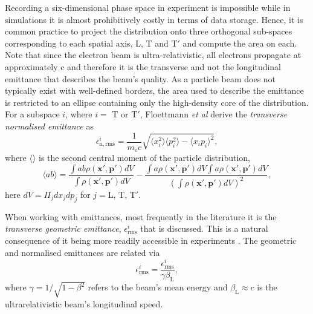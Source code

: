 Recording a six-dimensional phase space in experiment is impossible while in simulations it is almost prohibitively costly in terms of data storage. Hence, it is common practice to project the distribution onto three orthogonal sub-spaces corresponding to each spatial axis, L, T and T$'$ and compute the area on each. Note that since the electron beam is ultra-relativistic, all electrons propagate at approximately c and therefore it is the transverse and not the longitudinal emittance that describes the beam's quality. As a particle beam does not typically exist with well-defined borders, the area used to describe the emittance is restricted to an ellipse containing only the high-density core of the distribution. For a subspace $i$, where $i = $ T or T$'$, Floettmann \textit{et al} \cite{floettmannBasicFeaturesBeam2003} derive the \textit{transverse normalised emittance} as
\begin{equation}\label{eq:app_epsilon_n}
	\epsilon^i_\mathrm{n,rms} = \frac{1}{m_\mathrm{e}c} \sqrt{\langle x^2_i\rangle\langle p^2_i\rangle - \langle x_ip_i\rangle^2},
\end{equation}
where $\langle\rangle$ is the second central moment of the particle distribution,
\begin{equation}
	\langle ab \rangle = \frac{\int ab\rho(\mathbf{x}',\mathbf{p}')dV}{\int \rho (\mathbf{x}',\mathbf{p}')dV} - \frac{\int a\rho(\mathbf{x}',\mathbf{p}')dV\int a\rho(\mathbf{x}',\mathbf{p}')dV}{(\int \rho (\mathbf{x}',\mathbf{p}')dV)^2},
\end{equation}
here $dV = \Pi_jdx_jdp_j$ for $j = $L, T, T$'$.

When working with emittances, most frequently in the literature it is the \textit{transverse geometric emittance}, $\epsilon^i_\mathrm{rms}$ that is discussed. This is a natural consequence of it being more readily accessible in experiments \cite{mcDonald Methods of emittance measurement 122-132 Springer, 1989}. The geometric and normalised emittances are related via
\begin{equation}
	\epsilon^i_\mathrm{rms} = \frac{\epsilon^i_\mathrm{rms}}{\gamma \beta_\mathrm{L}},
\end{equation}
where $\gamma = 1/\sqrt{1-\beta^2}$ refers to the beam's mean energy and $\beta_\mathrm{L} \approx c$ is the ultrarelativistic beam's longitudinal speed.

